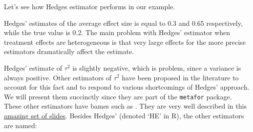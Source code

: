 \documentclass[]{book}
\newenvironment{Shaded}{\begin{snugshade}}{\end{snugshade}}
\newcommand{\KeywordTok}[1]{\textcolor[rgb]{0.13,0.29,0.53}{\textbf{#1}}}
\newcommand{\DecValTok}[1]{\textcolor[rgb]{0.00,0.00,0.81}{#1}}
\newcommand{\FloatTok}[1]{\textcolor[rgb]{0.00,0.00,0.81}{#1}}
\newcommand{\StringTok}[1]{\textcolor[rgb]{0.31,0.60,0.02}{#1}}
\newcommand{\ControlFlowTok}[1]{\textcolor[rgb]{0.13,0.29,0.53}{\textbf{#1}}}
\newcommand{\OperatorTok}[1]{\textcolor[rgb]{0.81,0.36,0.00}{\textbf{#1}}}
\newcommand{\NormalTok}[1]{#1}
\theoremstyle{definition}
\theoremstyle{definition}
\theoremstyle{definition}
\theoremstyle{remark}
\let\BeginKnitrBlock\begin \let\EndKnitrBlock\end
\begin{document}
\begin{Shaded}
\end{Shaded}

\BeginKnitrBlock{example}
\protect\hypertarget{exm:unnamed-chunk-153}{}{\label{exm:unnamed-chunk-153}
}Let's see how Hedges estimator performs in our example.
\EndKnitrBlock{example} Hedges' estimates of the average effect size is
equal to 0.3 and 0.65 respectively, while the true value is 0.2. The
main problem with Hedges' estimator when treatment effects are
heterogeneous is that very large effects for the more precise estimators
dramatically affect the estimate.

\BeginKnitrBlock{remark}
\iffalse{} {Remark. } \fi{}Hedges' estimate of \(\tau^2\) is slightly
negative, which is problem, since a variance is always positive. Other
estimators of \(\tau^2\) have been proposed in the literature to account
for this fact and to respond to various shortcomings of Hedges'
approach. We will present them succinctly since they are part of the
\texttt{metafor} package. These other estimators have bames such as .
They are very well described in this
\href{http://www.edii.uclm.es/~useR-2013/Tutorials/kovalchik/kovalchik_meta_tutorial.pdf}{amazing
set of slides}. Besides Hedges' (denoted `HE' in R), the other
estimators are named:
\EndKnitrBlock{remark}
\end{document}
